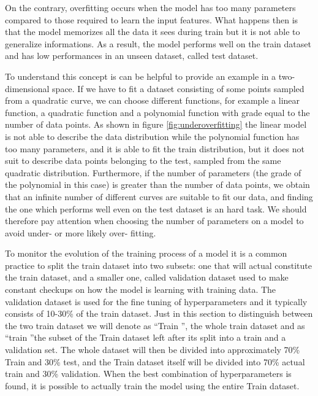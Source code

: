 \documentclass[11pt]{report}
\begin{document}
On the contrary, overfitting occurs when the model has too many parameters compared to those required to learn the input features.
What happens then is that the model memorizes all the data it sees during train but it is not able to generalize informations.
As a result, the model performs well on the train dataset and has low performances in an unseen dataset, called test dataset.

To understand this concept is can be helpful to provide an example in a two-dimensional space.
If we have to fit a dataset consisting of some points sampled from a quadratic curve, we can choose different functions, for example a linear function, a quadratic function and a polynomial function with grade equal to the number of data points.
As shown in figure \ref{fig:underoverfitting} the linear model is not able to describe the data distribution while the polynomial function has too many parameters, and it is able to fit the train distribution, but it does not suit to describe data points belonging to the test, sampled from the same quadratic distribution.
Furthermore, if the number of parameters (the grade of the polynomial in this case) is greater than the number of data points, we obtain that an infinite number of different curves are suitable to fit our data, and finding the one which performs well even on the test dataset is an hard task.
We should therefore pay attention when choosing the number of parameters on a model to avoid under- or more likely over- fitting.


To monitor the evolution of the training process of a model it is a common practice to split the train dataset into two subsets: one that will actual constitute the train dataset, and a smaller one, called validation dataset used to make constant checkups on how the model is learning with training data.
The validation dataset is used for the fine tuning of hyperparameters and it typically consists of 10-30\% of the train dataset.
Just in this section to distinguish between the two train dataset we will denote as \textquotedblleft Train \textquotedblright, the whole train dataset and as \textquotedblleft train \textquotedblright the subset of the Train dataset left after its split into a train and a validation set.
The whole dataset will then be divided into approximately 70\% Train and 30\% test, and the Train dataset itself will be divided into 70\% actual train and 30\% validation.
When the best combination of hyperparameters is found, it is possible to actually train the model using the entire Train dataset.
\end{document}
